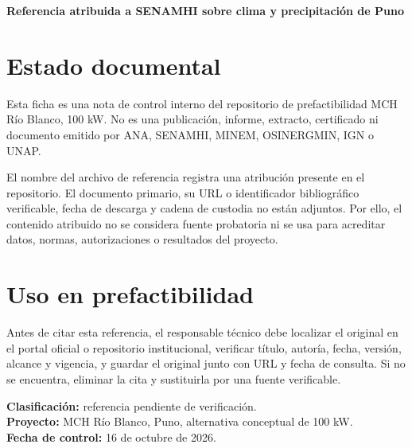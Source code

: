 \documentclass[11pt,a4paper]{article}
\begin{document}
\begin{center}\Large\bfseries\color{navy}Referencia atribuida a SENAMHI sobre clima y precipitación de Puno\end{center}
\vspace{1em}
\section*{Estado documental}
Esta ficha es una nota de control interno del repositorio de prefactibilidad MCH Río Blanco, 100 kW. No es una publicación, informe, extracto, certificado ni documento emitido por ANA, SENAMHI, MINEM, OSINERGMIN, IGN o UNAP.

El nombre del archivo de referencia registra una atribución presente en el repositorio. El documento primario, su URL o identificador bibliográfico verificable, fecha de descarga y cadena de custodia no están adjuntos. Por ello, el contenido atribuido no se considera fuente probatoria ni se usa para acreditar datos, normas, autorizaciones o resultados del proyecto.

\section*{Uso en prefactibilidad}
Antes de citar esta referencia, el responsable técnico debe localizar el original en el portal oficial o repositorio institucional, verificar título, autoría, fecha, versión, alcance y vigencia, y guardar el original junto con URL y fecha de consulta. Si no se encuentra, eliminar la cita y sustituirla por una fuente verificable.

\vfill
\noindent\textbf{Clasificación:} referencia pendiente de verificación.\\
\textbf{Proyecto:} MCH Río Blanco, Puno, alternativa conceptual de 100 kW.\\
\textbf{Fecha de control:} 16 de octubre de 2026.
\end{document}
